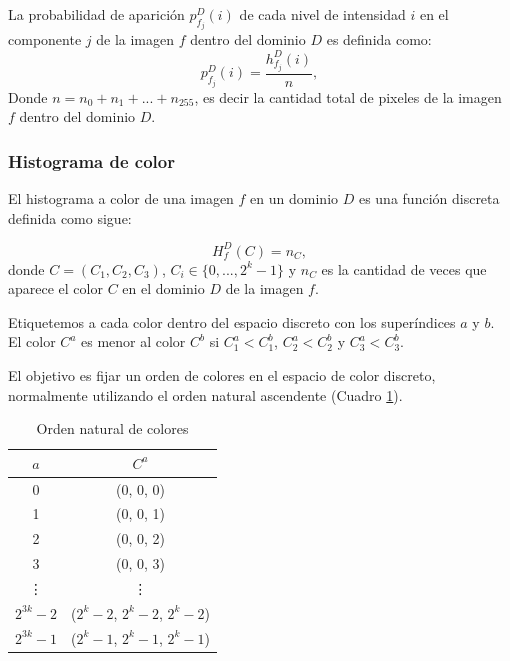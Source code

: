 La probabilidad de aparici\'on $p_{f_j}^{D}(i)$ de cada nivel de intensidad $i$ en el componente $j$ de la imagen $f$ dentro del dominio $D$ es definida como:
\begin{equation}
\label{probabilidad}
   p_{f_j}^{D}(i) = \frac{h_{f_j}^{D}(i)}{n},
\end{equation} Donde $n = n_0 + n_1 + ... + n_{255}$, es decir la cantidad total de pixeles de la imagen $f$ dentro del dominio $D$. 

\subsubsection{Histograma de color}
El histograma a color  de una imagen $f $ en un dominio $D$  es una función discreta definida como sigue:
	
	\begin{equation}
	\label{eq:histograma_color}
	H^D_{f}(C) = n_C,
	\end{equation} donde  $C = (C_1, C_2, C_3)$, $C_i \in \{0, ..., 2^k - 1\}$ y $n_C$ es la cantidad de veces que aparece el color $C$ en el dominio $D$ de la imagen $f$. 
	
	Etiquetemos a cada color dentro del espacio discreto con los superíndices $a$  y $b$. El color $C^a$  es menor al color $C^b$ si $C^a_1 < C^b_1$, $C^a_2 < C^b_2$ y  $C^a_3 < C^b_3$. 
	
	El objetivo es fijar un orden de colores en el espacio de color discreto, normalmente utilizando el orden natural ascendente (Cuadro \ref{table:orden_color}).
	
	\begin{table}[!htpb]
		\centering
		\caption{Orden natural de colores}
		\label{table:orden_color}
		\begin{tabular}{|c|c|}
			\hline
			$a$   & $C^a$                                                                     \\ \hline
			0   & (0, 0, 0)                                                             \\ \hline
			1   & (0, 0, 1)                                                             \\ \hline
			2   & (0, 0, 2)                                                             \\ \hline
			3   & (0, 0, 3)                                                             \\ \hline
			\vdots & \vdots                                                                      \\ \hline
			$2^{3k}-2$ & ($2^k-2$, $2^k-2$, $2^k-2$) \\ \hline
			$2^{3k}-1$   & ($2^k-1$, $2^k-1$, $2^k-1$) \\ \hline
		\end{tabular}
	\end{table}
	
